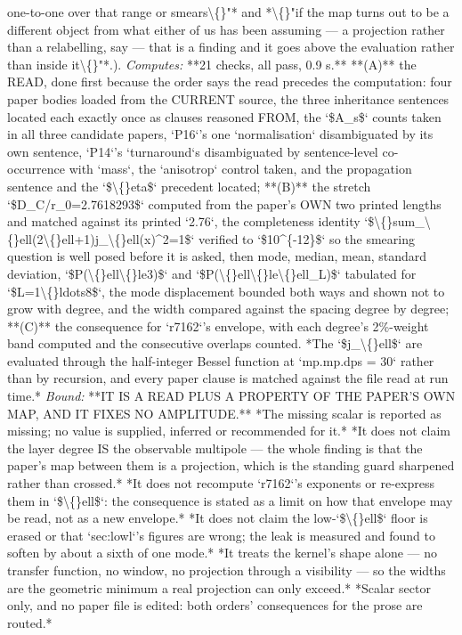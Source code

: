 \begin{description}
one-to-one over that range or smears\textbackslash\{\}"* and *\textbackslash\{\}"if the map turns out to be a different object from what either of us has been assuming --- a projection rather than a relabelling, say --- that is a finding and it goes above the evaluation rather than inside it\textbackslash\{\}"*.). 
\emph{Computes:} **21 checks, all pass, 0.9 s.** **(A)** the READ, done first because the order says the read precedes the computation: four paper bodies loaded from the CURRENT source, the three inheritance sentences located each exactly once as clauses reasoned FROM, the `\$A\_s\$` counts taken in all three candidate papers, `P16`'s one `normalisation` disambiguated by its own sentence, `P14`'s `turnaround`s disambiguated by sentence-level co-occurrence with `mass`, the `anisotrop` control taken, and the propagation sentence and the `\$\textbackslash\{\}eta\$` precedent located; **(B)** the stretch `\$D\_C/r\_0=2.7618293\$` computed from the paper's OWN two printed lengths and matched against its printed `2.76`, the completeness identity `\$\textbackslash\{\}sum\_\textbackslash\{\}ell(2\textbackslash\{\}ell+1)j\_\textbackslash\{\}ell(x)\textasciicircum{}2=1\$` verified to `\$10\textasciicircum{}\{-12\}\$` so the smearing question is well posed before it is asked, then mode, median, mean, standard deviation, `\$P(\textbackslash\{\}ell\textbackslash\{\}le3)\$` and `\$P(\textbackslash\{\}ell\textbackslash\{\}le\textbackslash\{\}ell\_L)\$` tabulated for `\$L=1\textbackslash\{\}ldots8\$`, the mode displacement bounded both ways and shown not to grow with degree, and the width compared against the spacing degree by degree; **(C)** the consequence for `r7162`'s envelope, with each degree's 2\%-weight band computed and the consecutive overlaps counted.  *The `\$j\_\textbackslash\{\}ell\$` are evaluated through the half-integer Bessel function at `mp.mp.dps = 30` rather than by recursion, and every paper clause is matched against the file read at run time.*
 \emph{Bound:}  **IT IS A READ PLUS A PROPERTY OF THE PAPER'S OWN MAP, AND IT FIXES NO AMPLITUDE.** *The missing scalar is reported as missing; no value is supplied, inferred or recommended for it.*  *It does not claim the layer degree IS the observable multipole --- the whole finding is that the paper's map between them is a projection, which is the standing guard sharpened rather than crossed.*  *It does not recompute `r7162`'s exponents or re-express them in `\$\textbackslash\{\}ell\$`: the consequence is stated as a limit on how that envelope may be read, not as a new envelope.*  *It does not claim the low-`\$\textbackslash\{\}ell\$` floor is erased or that `sec:lowl`'s figures are wrong; the leak is measured and found to soften by about a sixth of one mode.*  *It treats the kernel's shape alone --- no transfer function, no window, no projection through a visibility --- so the widths are the geometric minimum a real projection can only exceed.*  *Scalar sector only, and no paper file is edited: both orders' consequences for the prose are routed.*

\end{description}
